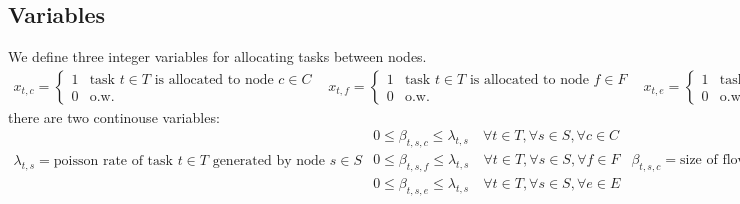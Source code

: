\documentclass[conference]{IEEEtran}
\begin{document}
    \subsection{Variables}

    We define three integer variables for allocating tasks between nodes.
    \begin{subequations}
      \begin{align}
        x_{t,c} =
        \begin{cases}
          1 & \text{task $t \in T$ is allocated to node $c \in C$} \\
          0 & \text{o.w.}
        \end{cases}
      \end{align}

      \begin{align}
        x_{t,f} =
        \begin{cases}
          1 & \text{task $t \in T$ is allocated to node $f \in F$} \\
          0 & \text{o.w.}
        \end{cases}
      \end{align}

     \begin{align}
       x_{t,e} =
       \begin{cases}
         1 & \text{task $t \in T$ is allocated to node $e \in E$} \\
         0 & \text{o.w.}
      \end{cases}
     \end{align}
  \end{subequations}
  there are two continouse variables:
  \begin{subequations}
     \begin{align}
        \lambda_{t,s} = \text{poisson rate of task $t \in T$ generated by node $s \in S$}
     \end{align}

     \begin{align}
       0 \le \beta_{t,s,c} \le \lambda_{t,s}  \quad \forall{t \in T}, \forall{s \in S}, \forall{c \in C} \\
       0 \le \beta_{t,s,f} \le \lambda_{t,s}  \quad \forall{t \in T}, \forall{s \in S}, \forall{f \in F} \\
       0 \le \beta_{t,s,e} \le \lambda_{t,s}  \quad \forall{t \in T}, \forall{s \in S}, \forall{e \in E}
     \end{align}

     \begin{align}
       \beta_{t,s,c} = \text{size of flow of task $t \in T$ from node $s \in S$ to node $c \in C$}
     \end{align}
   \end{subequations}
\end{document}
